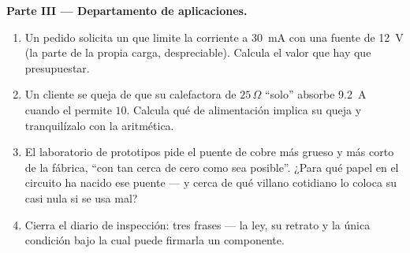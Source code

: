 \begin{problem}
\medskip\noindent\textbf{Parte III --- Departamento de
aplicaciones.}
\begin{enumerate}[resume]
  \item Un pedido solicita un  que limite la corriente a
        \qty{30}{mA} con una fuente de \qty{12}{V} (la parte de la
        propia carga, despreciable). Calcula el valor que hay que
        presupuestar.
  \item Un cliente se queja de que su  calefactora de
        $25\,\Omega$ ``solo'' absorbe \qty{9.2}{A} cuando el
         permite $10$. Calcula qué  de
        alimentación implica su queja y tranquilízalo con la
        aritmética.
  \item El laboratorio de prototipos pide el puente de cobre más
        grueso y más corto de la fábrica, ``con tan cerca de cero
         como sea posible''. ¿Para qué papel en el
        circuito ha nacido ese puente --- y cerca de qué villano
        cotidiano lo coloca su  casi nula si se usa
        mal?
  \item Cierra el diario de inspección: tres frases --- la ley, su
        retrato y la única condición bajo la cual puede firmarla un
        componente.
\end{enumerate}
\end{problem}
